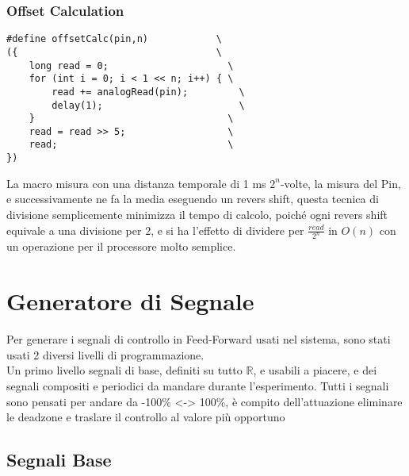 \subsubsection{Offset Calculation}

\begin{lstlisting}[style=cppStyle,caption={Macro per calcolo Offset},label=lst:offsetCalc] 
#define offsetCalc(pin,n)            \
({                                   \
	long read = 0;                     \
	for (int i = 0; i < 1 << n; i++) { \
		read += analogRead(pin);         \
		delay(1);                        \
	}                                  \
	read = read >> 5;                  \
	read;                              \
})
\end{lstlisting}
\noindent
La macro misura con una distanza temporale di 1 ms $2^n$-volte, la misura del Pin, e successivamente ne fa la media eseguendo un revers shift, questa tecnica di divisione semplicemente minimizza il tempo di calcolo, poiché ogni revers shift equivale a una divisione per 2, e si ha l'effetto di dividere per $\frac{read}{2^n}$ in $O(n)$ con un operazione per il processore molto semplice.

\newpage
\section{Generatore di Segnale}

Per generare i segnali di controllo in Feed-Forward usati nel sistema, sono stati usati 2 diversi livelli di programmazione.\\
Un primo livello segnali di base, definiti su tutto $\mathbb{R}$, e usabili a piacere, e dei segnali compositi e periodici da mandare durante l'esperimento.
Tutti i segnali sono pensati per andare da -100\% <-> 100\%, è compito dell'attuazione
eliminare le deadzone e traslare il controllo al valore più opportuno

\subsection{Segnali Base}

